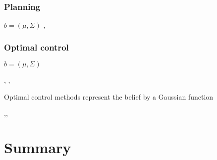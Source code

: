 \subsubsection{Planning}
$b = (\mu,\Sigma)$
\cite{Quadrator_2008},\cite{BelRoadMap_2009}


\subsubsection{Optimal control}
$b = (\mu,\Sigma)$
 
\cite{Erez10ascalable},
\cite{mc_update_ppomdps}, 
\cite{Platt-RSS-10}

 

Optimal control methods represent the belief by a Gaussian function 


\cite{Bayesian_explor_exploit_2009},\cite{Spaan05icra},\cite{Thrun_2005}
 

\cite{Rand_belief_space_replanning}
 
 
 \cite{Ross08onlineplanning}
 
 \cite{Macro_uncertainty_2011}

\section{Summary}




